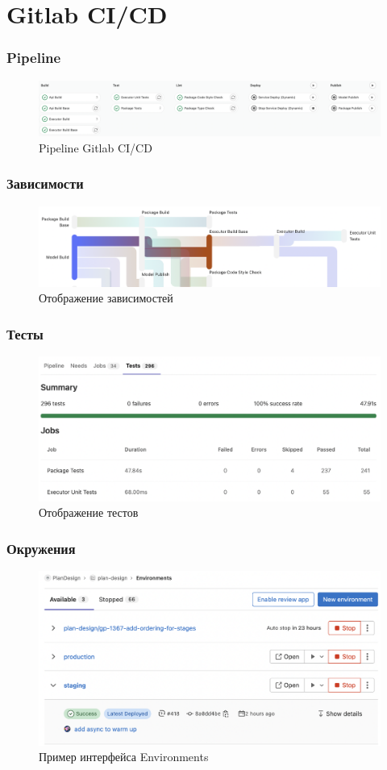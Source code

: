 \section{Gitlab CI/CD}

\begin{frame}
\frametitle{Pipeline}
\begin{figure}
    \includegraphics[scale=.3]{pictures/implementation/stages}
    \caption{Pipeline Gitlab CI/CD}
\end{figure}
\end{frame}

\begin{frame}
\frametitle{Зависимости}
\begin{figure}
    \includegraphics[scale=.45]{pictures/implementation/dependencies}
    \caption{Отображение зависимостей}
\end{figure}
\end{frame}


\begin{frame}
\frametitle{Тесты}
\begin{figure}
    \includegraphics[scale=.4]{pictures/implementation/tests}
    \caption{Отображение тестов}
\end{figure}
\end{frame}


\begin{frame}
\frametitle{Окружения}
\begin{figure}
    \includegraphics[scale=.45]{pictures/implementation/environment}
    \caption{Пример интерфейса Environments}
\end{figure}
\end{frame}



